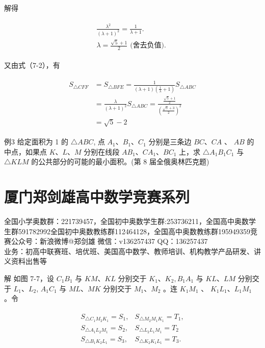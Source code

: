 \documentclass[10pt]{article}
\begin{document}
解得

\begin{align*}
\begin{gathered}
\frac{\lambda^{2}}{(\lambda+1)^{2}}=\frac{1}{\lambda+1} . \\
\lambda=\frac{\sqrt{5}+1}{2} \text { (舍去负值). }
\end{gathered}
\end{align*}

又由式（7-2），有

\begin{align*}
\begin{aligned}
S_{\triangle C F F} & =S_{\triangle B F E}=\frac{1}{(\lambda+1)\left(\frac{1}{\lambda}+1\right)} S_{\triangle A B C} \\
& =\frac{\lambda}{(\lambda+1)^{2}} S_{\triangle A B C}=\frac{\frac{\sqrt{5}+1}{2}}{\left(\frac{\sqrt{5}+3}{2}\right)^{2}} \\
& =\sqrt{5}-2
\end{aligned}
\end{align*}

例3 给定面积为 1 的 $\triangle A B C$, 点 $A_{1} 、 B_{1} 、 C_{1}$ 分别是三条边 $B C 、 C A$ 、 $A B$ 的中点，如果点 $K 、 L 、 M$ 分别在线段 $A B_{1} 、 C A_{1} 、 B C_{1}$ 上，求 $\triangle A_{1} B_{1} C_{1}$ 与 $\triangle K L M$ 的公共部分的可能的最小面积。(第 8 届全俄奥林匹克题)

\section*{厦门郑剑雄高中数学竞赛系列}
全国小学奥数群：221739457，全国初中奥数学生群:253736211，全国高中奥数学生群591782992全国初中奥数教练群112464128，全国高中奥数教练群195949359竞赛公众号：新浪微博@郑剑雄 微信：v136257437 QQ：136257437\\
业务：初高中联赛班、培优班、美国高中数学、教师培训、机构教学产品研发、讲义资料出售等

解 如图 7-7，设 $C_{1} B_{1}$ 与 $K M 、 K L$ 分别交于 $K_{1} 、 K_{2}, B_{1} A_{1}$ 与 $K L 、 L M$ 分别交于 $L_{1} 、 L_{2}$, $A_{1} C_{1}$ 与 $M L 、 M K$ 分别交于 $M_{1} 、 M_{2}$ 。连 $K_{1} M_{1}$ 、 $K_{1} L_{1} 、 L_{1} M_{1}$ 。令

\begin{align*}
\begin{array}{ll}
S_{\triangle C_{1} M_{2} K_{1}}=S_{1}, & S_{\triangle M_{2} M_{1} K_{1}}=T_{1}, \\
S_{\triangle A_{1} L_{2} M_{1}}=S_{2}, & S_{\triangle L_{2} L_{1} M_{1}}=T_{2} \\
S_{\triangle B_{1} K_{2} L_{1}}=S_{3}, & S_{\triangle K_{2} K_{1} L_{1}}=T_{3} .
\end{array}
\end{align*}
\end{document}
